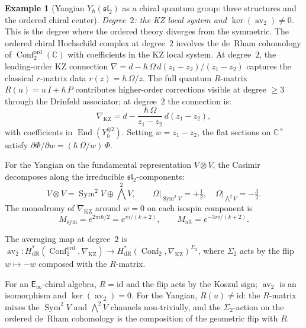 \documentclass[11pt,reqno]{amsart}
\theoremstyle{definition}
\newtheorem{example}[theorem]{Example}
\theoremstyle{remark}
\newcommand{\Einf}{\mathsf{E}_{\infty}}
\DeclareMathOperator{\End}{End}
\DeclareMathOperator{\Conf}{Conf}
\DeclareMathOperator{\av}{av}
\newcommand{\CC}{\mathbb{C}}
\newcommand{\id}{\mathrm{id}}
\numberwithin{equation}{section}
\begin{document}
\begin{example}[Yangian $Y_\hbar(\mathfrak{sl}_2)$
as a chiral quantum group: three structures and the
ordered chiral center]
\smallskip
\noindent\emph{Degree~$2$: the KZ local system and $\ker(\av_2) \neq 0$.}
This is the degree where the ordered theory diverges from
the symmetric. The ordered chiral Hochschild complex at
degree~$2$ involves the de~Rham cohomology of
$\Conf_2^{\mathrm{ord}}(\CC)$ with coefficients in the KZ
local system. At degree~$2$, the leading-order KZ connection
$\nabla = d - \hbar\,\Omega\,d(z_1 - z_2)/(z_1 - z_2)$
captures the classical $r$-matrix data
$r(z) = \hbar\,\Omega/z$. The full quantum $R$-matrix
$R(u) = u\,I + \hbar\,P$ contributes higher-order
corrections visible at degree $\geq 3$ through the Drinfeld
associator; at degree~$2$ the connection is:
\begin{equation}\label{eq:yangian-kz-degree2}
  \nabla_{\mathrm{KZ}}
  = d - \frac{\hbar\,\Omega}{z_1 - z_2}\,d(z_1 - z_2),
\end{equation}
with coefficients in
$\End(Y_\hbar^{\otimes 2})$.
Setting $w = z_1 - z_2$, the flat sections on $\CC^\times$
satisfy $\partial \Phi / \partial w
= (\hbar\,\Omega/w)\,\Phi$.

For the Yangian on the fundamental representation
$V \otimes V$, the Casimir decomposes along the
irreducible $\mathfrak{sl}_2$-components:
\[
  V \otimes V = \operatorname{Sym}^2 V \oplus \bigwedge^2 V,
  \qquad
  \Omega\big|_{\operatorname{Sym}^2 V} = +\tfrac{1}{2},
  \quad
  \Omega\big|_{\bigwedge^2 V} = -\tfrac{3}{2}.
\]
The monodromy of $\nabla_{\mathrm{KZ}}$ around $w = 0$
on each isospin component is
\begin{equation}\label{eq:yangian-monodromy}
  M_{\mathrm{sym}} = e^{2\pi i \hbar/2}
  = e^{\pi i/(k+2)}, \qquad
  M_{\mathrm{alt}} = e^{-3\pi i/(k+2)}.
\end{equation}

The averaging map at degree~$2$ is
$\av_2 \colon H^*_{\mathrm{dR}}(\Conf_2^{\mathrm{ord}},
\nabla_{\mathrm{KZ}}) \to
H^*_{\mathrm{dR}}(\Conf_2,
\nabla_{\mathrm{KZ}})^{\Sigma_2}$,
where $\Sigma_2$ acts by the flip $w \mapsto -w$
composed with the $R$-matrix.

For an $\Einf$-chiral algebra, $R = \id$ and the flip acts
by the Koszul sign; $\av_2$ is an isomorphism and
$\ker(\av_2) = 0$. For the Yangian, $R(u) \neq \id$: the
$R$-matrix mixes the $\operatorname{Sym}^2 V$ and
$\bigwedge^2 V$ channels non-trivially, and the
$\Sigma_2$-action on the ordered de~Rham cohomology is the
composition of the geometric flip with $R$.


\end{example}
\end{document}
